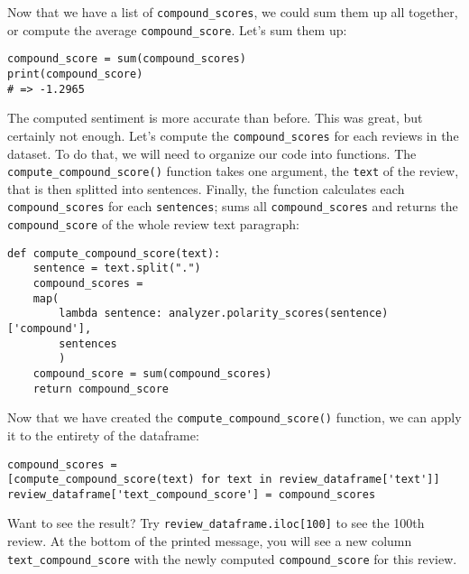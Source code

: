 	Now that we have a list of \verb|compound_scores|, we could sum them up all together, or compute the average \verb|compound_score|. Let's sum them up:
	\begin{Verbatim}
compound_score = sum(compound_scores)
print(compound_score)
# => -1.2965
	\end{Verbatim}
	The computed sentiment is more accurate than before. This was great, but certainly not enough. Let's compute the \verb|compound_scores| for each reviews in the dataset. To do that, we will need to organize our code into functions. The \verb|compute_compound_score()| function takes one argument, the \verb|text| of the review, that is then splitted into sentences. Finally, the function calculates each \verb|compound_scores| for each \verb|sentences|; sums all \verb|compound_scores| and returns the \verb|compound_score| of the whole review text paragraph:
	\begin{Verbatim}
def compute_compound_score(text):
	sentence = text.split(".")
	compound_scores = 
	map(
		lambda sentence: analyzer.polarity_scores(sentence)['compound'], 
		sentences
		)
	compound_score = sum(compound_scores)
	return compound_score
	\end{Verbatim}
	Now that we have created the \verb|compute_compound_score()| function, we can apply it to the entirety of the dataframe:
	\begin{Verbatim}
compound_scores = 
[compute_compound_score(text) for text in review_dataframe['text']]
review_dataframe['text_compound_score'] = compound_scores
	\end{Verbatim}
	Want to see the result? Try \verb|review_dataframe.iloc[100]| to see the 100th review. At the bottom of the printed message, you will see a new column \verb|text_compound_score| with the newly computed \verb|compound_score| for this review.
	

